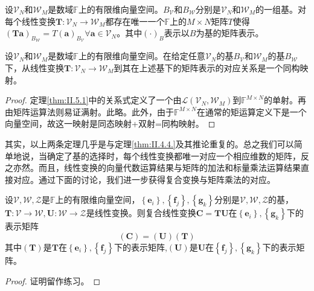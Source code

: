 \documentclass[main.tex]{subfiles}
\begin{document}
\begin{theorem}\label{thm:II.5.1}
设$\mathcal{V}_N$和$\mathcal{W}_M$是数域$\mathbb{F}$上的有限维向量空间。$B_\mathcal{V}$和$B_\mathcal{W}$分别是$\mathcal{V}_N$和$\mathcal{W}_M$的一组基。对每个线性变换$\mathbf{T}:\mathcal{V}_N\rightarrow\mathcal{W}_M$都存在唯一一个$\mathbb{F}$上的$M\times N$矩阵$T$使得$\left(\mathbf{Ta}\right)_{B_\mathcal{W}}=T\left(\mathbf{a}\right)_{B_\mathcal{V}}\forall\mathbf{a}\in\mathcal{V}_N$。其中$\left(\cdot\right)_B$表示以$B$为基的矩阵表示。
\end{theorem}

\begin{theorem}
设$\mathcal{V}_N$和$\mathcal{W}_M$是数域$\mathbb{F}$上的有限维向量空间。在给定任意$\mathcal{V}_N$的基$B_\mathcal{V}$和$\mathcal{W}_M$的基$B_\mathcal{W}$下，从线性变换$\mathbf{T}:\mathcal{V}_N\rightarrow\mathcal{W}_M$到其在上述基下的矩阵表示的对应关系是一个同构映射。
\end{theorem}
\begin{proof}
定理\ref{thm:II.5.1}中的关系式定义了一个由$\mathcal{L}\left(\mathcal{V}_N,\mathcal{W}_M\right)$到$\mathbb{F}^{M\times N}$的单射。再由矩阵运算法则易证满射。此略。此外，由于$\mathbb{F}^{M\times N}$在通常的矩运算定义下是一个向量空间，故这一映射是同态映射+双射=同构映射。
\end{proof}

其实，以上两条定理几乎是与定理\ref{thm:II.4.4.}及其推论重复的。总之我们可以简单地说，当确定了基的选择时，每个线性变换都唯一对应一个相应维数的矩阵，反之亦然。而且，线性变换的向量代数运算结果与矩阵的加法和标量乘法运算结果直接对应。通过下面的讨论，我们进一步获得复合变换与矩阵乘法的对应。

\begin{theorem}\label{thm:II.5.3}
设$\mathcal{V},\mathcal{W},\mathcal{Z}$是$\mathbb{F}$上的有限维向量空间，$\left\{\mathbf{e}_i\right\},\left\{\mathbf{f}_j\right\},\left\{\mathbf{g}_k\right\}$分别是$\mathcal{V},\mathcal{W},\mathcal{Z}$的基，$\mathbf{T}:\mathcal{V}\rightarrow\mathcal{W},\mathbf{U}:\mathcal{W}\rightarrow\mathcal{Z}$是线性变换。则复合线性变换$\mathbf{C}=\mathbf{TU}$在$\left\{\mathbf{e}_i\right\},\left\{\mathbf{g}_k\right\}$下的表示矩阵
\[\left(\mathbf{C}\right)=\left(\mathbf{U}\right)\left(\mathbf{T}\right)\]
其中$\left(\mathbf{T}\right)$是$\mathbf{T}$在$\left\{\mathbf{e}_i\right\},\left\{\mathbf{f}_j\right\}$下的表示矩阵,$\left(\mathbf{U}\right)$是$\mathbf{U}$在$\left\{\mathbf{f}_j\right\},\left\{\mathbf{g}_k\right\}$下的表示矩阵。
\end{theorem}
\begin{proof}
证明留作练习。
\end{proof}
\end{document}
